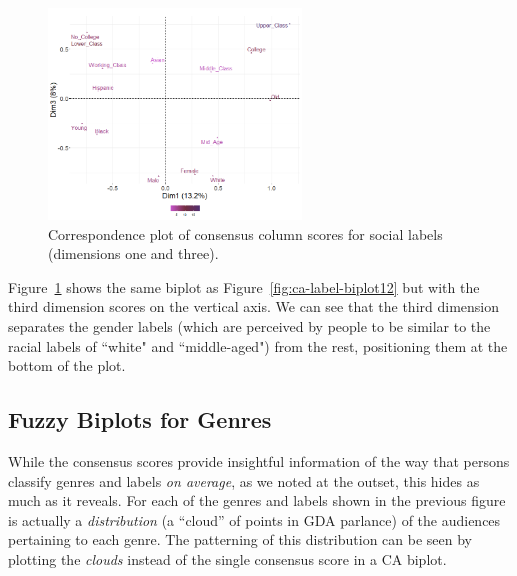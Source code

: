 \documentclass[12pt]{article}
\begin{document}
\begin{figure}[t]
    \captionsetup[subfigure]{font=footnotesize,labelfont=footnotesize}
    \centering
        \includegraphics[trim={0cm 0cm 0cm 0cm},clip, width=0.6\textwidth]{Plots/ca-label-col13.png}
    \caption{Correspondence plot of consensus column scores for social labels (dimensions one and three).}
    \label{fig:ca-label-biplot13}
\end{figure}

Figure~\ref{fig:ca-label-biplot13} shows the same biplot as Figure~\ref{fig:ca-label-biplot12} but with the third dimension scores on the vertical axis. We can see that the third dimension separates the gender labels (which are perceived by people to be similar to the racial labels of ``white" and ``middle-aged") from the rest, positioning them at the bottom of the plot. 
\subsection*{Fuzzy Biplots for Genres}
While the consensus scores provide insightful information of the way that persons classify genres and labels \textit{on average}, as we noted at the outset, this hides as much as it reveals. For each of the genres and labels shown in the previous figure is actually a \textit{distribution} (a ``cloud'' of points in GDA parlance) of the audiences pertaining to each genre. The patterning of this distribution can be seen by plotting the \textit{clouds} instead of the single consensus score in a CA biplot. 
\end{document}
